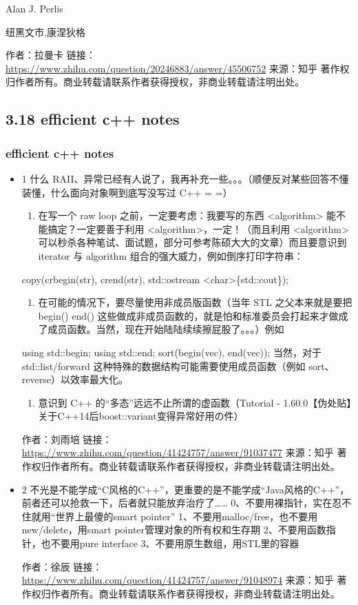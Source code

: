 \documentclass[11pt]{article}
\begin{document}
Alan J. Perlis

纽黑文市,康涅狄格

作者：拉曼卡
链接：\url{https://www.zhihu.com/question/20246883/answer/45506752}
来源：知乎
著作权归作者所有。商业转载请联系作者获得授权，非商业转载请注明出处。
\subsection*{3.18 efficient c++ notes}
\label{sec:orgheadline159}
\subsubsection*{efficient c++ notes}
\label{sec:orgheadline158}
\begin{itemize}
\item 1
\label{sec:orgheadline156}
什么 RAII、异常已经有人说了，我再补充一些。。。（顺便反对某些回答不懂装懂，什么面向对象啊到底写没写过 C++ = =）
\begin{enumerate}
\item 在写一个 raw loop 之前，一定要考虑：我要写的东西 <algorithm> 能不能搞定？一定要善于利用 <algorithm>，一定！（而且利用 <algorithm> 可以秒杀各种笔试、面试题，部分可参考陈硕大大的文章）而且要意识到 iterator 与 algorithm 组合的强大威力，例如倒序打印字符串：
\end{enumerate}
copy(crbegin(str), crend(str), std::ostream <char>\{std::cout\});
\begin{enumerate}
\item 在可能的情况下，要尽量使用非成员版函数（当年 STL 之父本来就是要把 begin() end() 这些做成非成员函数的，就是怕和标准委员会打起来才做成了成员函数。当然，现在开始陆陆续续擦屁股了。。。）例如
\end{enumerate}
using std::begin;
using std::end;
sort(begin(vec), end(vec));
当然，对于 std::list/forward 这种特殊的数据结构可能需要使用成员函数（例如 sort、reverse）以效率最大化。
\begin{enumerate}
\item 意识到 C++ 的“多态”远远不止所谓的虚函数（Tutorial - 1.60.0【伪处贴】关于C++14后boost::variant变得异常好用の件）
\end{enumerate}

作者：刘雨培
链接：\url{https://www.zhihu.com/question/41424757/answer/91037477}
来源：知乎
著作权归作者所有。商业转载请联系作者获得授权，非商业转载请注明出处。
\item 2
\label{sec:orgheadline157}
不光是不能学成“C风格的C++”，更重要的是不能学成“Java风格的C++”，前者还可以抢救一下，后者就只能放弃治疗了……
0、不要用裸指针，实在忍不住就用“世界上最傻的smart pointer”
1、不要用malloc/free，也不要用new/delete，用smart pointer管理对象的所有权和生存期
2、不要用函数指针，也不要用pure interface
3、不要用原生数组，用STL里的容器

作者：徐辰
链接：\url{https://www.zhihu.com/question/41424757/answer/91048974}
来源：知乎
著作权归作者所有。商业转载请联系作者获得授权，非商业转载请注明出处。
\end{itemize}
\end{document}
